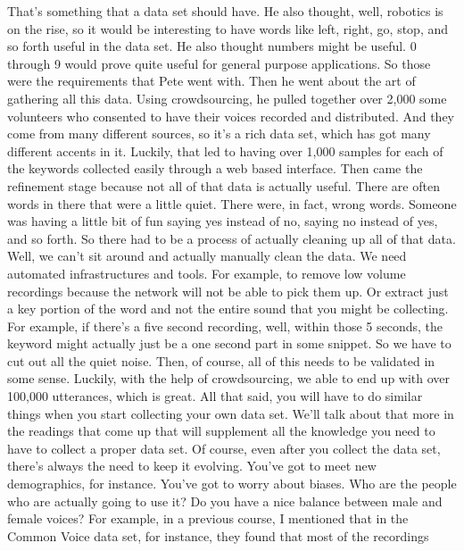     That's something that a data set should have.
    He also thought, well, robotics is on the rise,
    so it would be interesting to have words like left, right, go, stop,
    and so forth useful in the data set.
    He also thought numbers might be useful.
    0 through 9 would prove quite useful for general purpose applications.
    So those were the requirements that Pete went with.
    Then he went about the art of gathering all this data.
    Using crowdsourcing, he pulled together over 2,000
    some volunteers who consented to have their voices recorded and distributed.
    And they come from many different sources,
    so it's a rich data set, which has got many different accents in it.
    Luckily, that led to having over 1,000 samples for each of the keywords
    collected easily through a web based interface.
    Then came the refinement stage because not all of that data
    is actually useful.
    There are often words in there that were a little quiet.
    There were, in fact, wrong words.
    Someone was having a little bit of fun saying yes instead of no,
    saying no instead of yes, and so forth.
    So there had to be a process of actually cleaning up all of that data.
    Well, we can't sit around and actually manually clean the data.
    We need automated infrastructures and tools.
    For example, to remove low volume recordings because the network
    will not be able to pick them up.
    Or extract just a key portion of the word and not the entire sound
    that you might be collecting.
    For example, if there's a five second recording,
    well, within those 5 seconds, the keyword
    might actually just be a one second part in some snippet.
    So we have to cut out all the quiet noise.
    Then, of course, all of this needs to be validated in some sense.
    Luckily, with the help of crowdsourcing, we
    able to end up with over 100,000 utterances, which is great.
    All that said, you will have to do similar things when
    you start collecting your own data set.
    We'll talk about that more in the readings
    that come up that will supplement all the knowledge you need
    to have to collect a proper data set.
    Of course, even after you collect the data set,
    there's always the need to keep it evolving.
    You've got to meet new demographics, for instance.
    You've got to worry about biases.
    Who are the people who are actually going to use it?
    Do you have a nice balance between male and female voices?
    For example, in a previous course, I mentioned that in the Common Voice data
    set, for instance, they found that most of the recordings
